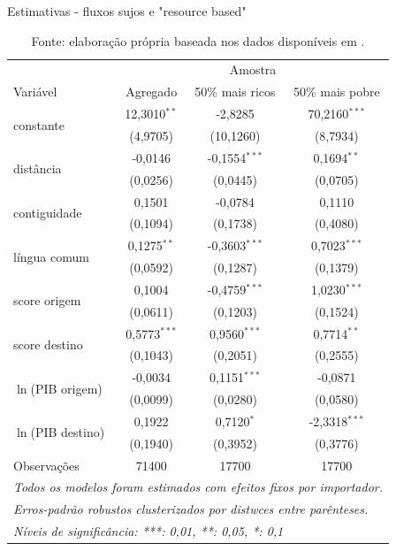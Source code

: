 \documentclass[12pt,
               openright,
               oneside,
               a4paper,
							 section=TITLE,     %
               subsection=Title,  %
               english,brazil]{article}
\begin{document}
\begin{table}[H]
\centering
\caption{Estimativas - fluxos sujos e "resource based"}
\label{tab:resultados_rb}
\begin{tabular}{@{}lccc@{}}
 & \multicolumn{3}{c}{Amostra} \\ \cmidrule(l){2-4} 
Variável & Agregado & 50\% mais ricos & 50\% mais pobre \\ \midrule
\multirow{2}{*}{constante} & 12,3010$^{**}$ & -2,8285 & 70,2160$^{***}$ \\
 & (4,9705) & (10,1260) & (8,7934) \\
\multirow{2}{*}{distância} & -0,0146 & -0,1554$^{***}$ & 0,1694$^{**}$ \\
 & (0,0256) & (0,0445) & (0,0705) \\
\multirow{2}{*}{contiguidade} & 0,1501 & -0,0784 & 0,1110 \\
 & (0,1094) & (0,1738) & (0,4080) \\
\multirow{2}{*}{língua comum} & 0,1275$^{**}$ & -0,3603$^{***}$ & 0,7023$^{***}$ \\
 & (0,0592) & (0,1287) & (0,1379) \\
\multirow{2}{*}{score origem} & 0,1004 & -0,4759$^{***}$ & 1,0230$^{***}$ \\
 & (0,0611) & (0,1203) & (0,1524) \\
\multirow{2}{*}{score destino} & 0,5773$^{***}$ & 0,9560$^{***}$ & 0,7714$^{**}$ \\
 & (0,1043) & (0,2051) & (0,2555) \\
\multirow{2}{*}{$\ln$(PIB origem)} & -0,0034 & 0,1151$^{***}$ & -0,0871 \\
 & (0,0099) & (0,0280) & (0,0580) \\
\multirow{2}{*}{$\ln$(PIB destino)} & 0,1922 & 0,7120$^{*}$ & -2,3318$^{***}$ \\
 & (0,1940) & (0,3952) & (0,3776) \\ \midrule
Observações& 71400&17700&17700\\
\bottomrule\bottomrule
\multicolumn{4}{l}{\emph{Todos os modelos foram estimados com efeitos fixos por importador.}}\\
\multicolumn{4}{l}{\emph{Erros-padrão robustos clusterizados por distwces entre parênteses.}}\\
\multicolumn{4}{l}{\emph{Níveis de significância: ***: 0,01, **: 0,05, *: 0,1}}\\
\end{tabular}
\caption*{\RaggedRight  Fonte: elaboração própria baseada nos dados disponíveis em \cite{Cepii2019, Comtrade2019, WorldBank2019}.} 
\end{table}
\end{document}
